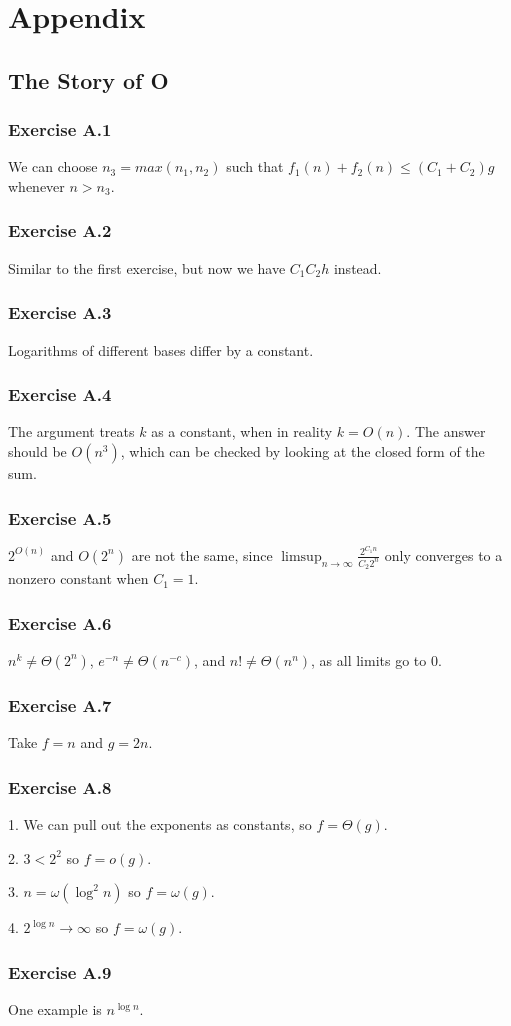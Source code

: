 \section{Appendix}

\subsection{The Story of O}

\subsubsection{Exercise A.1}
We can choose $n_3 = max(n_1, n_2)$ such that $f_1(n) + f_2(n) \leq (C_1 + C_2)g$ whenever
$n > n_3$.

\subsubsection{Exercise A.2}
Similar to the first exercise, but now we have $C_1 C_2 h$ instead.

\subsubsection{Exercise A.3}
Logarithms of different bases differ by a constant.

\subsubsection{Exercise A.4}
The argument treats $k$ as a constant, when in reality $k = O(n)$. The answer should be
$O(n^3)$, which can be checked by looking at the closed form of the sum.

\subsubsection{Exercise A.5}
$2^{O(n)}$ and $O(2^{n})$ are not the same, since $\limsup_{n \to  \infty} \frac{2^{C_1n}}{C_{2}2^n}$
only converges to a nonzero constant when $C_1 = 1$.

\subsubsection{Exercise A.6}
$n^{k} \neq \Theta(2^n)$, $e^{-n} \neq \Theta(n^{-c})$, and $n! \neq \Theta(n^n)$, as all limits go to 0.

\subsubsection{Exercise A.7}
Take $f = n$ and $g = 2n$. 

\subsubsection{Exercise A.8}
1. We can pull out the exponents as constants, so $f = \Theta(g)$.

2. $3 < 2^2$ so $f = o(g)$.

3. $n = \omega(\log^2 n)$ so $f = \omega(g)$.

4. $2^{\log n} \to \infty$ so $f = \omega(g)$.

\subsubsection{Exercise A.9}
One example is $n^{\log n}$.
